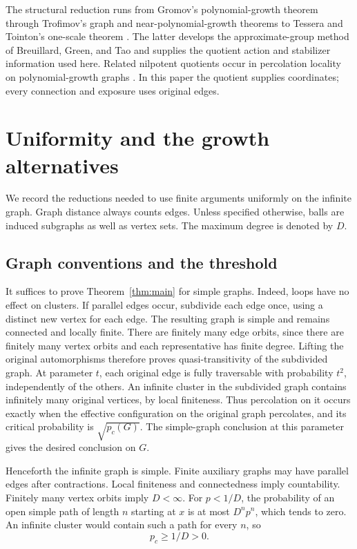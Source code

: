 \documentclass[11pt]{article}
\theoremstyle{definition}
\begin{document}
The structural reduction runs from Gromov's polynomial-growth
theorem \cite{Gromov1981} through Trofimov's graph and
near-polynomial-growth theorems \cite{Trofimov1985,Trofimov2003}
to Tessera and Tointon's one-scale theorem
\cite[Corollary~2.4]{TesseraTointon2021}. The latter develops the
approximate-group method of Breuillard, Green, and Tao
\cite{BreuillardGreenTao2012} and supplies the quotient action and
stabilizer information used here. Related nilpotent quotients occur
in percolation locality on polynomial-growth graphs
\cite{ContrerasMartineauTassion2023Locality}. In this paper the
quotient supplies coordinates; every connection and exposure uses
original edges.

\section{Uniformity and the growth alternatives}
\label{sec:preliminaries}

We record the reductions needed to use finite arguments uniformly on
the infinite graph. Graph distance always counts edges. Unless
specified otherwise, balls are induced subgraphs as well as vertex
sets. The maximum degree is denoted by $D$.

\subsection{Graph conventions and the threshold}

It suffices to prove Theorem~\ref{thm:main} for simple graphs.
Indeed, loops have no effect on clusters. If parallel edges occur,
subdivide each edge once, using a distinct new vertex for each edge.
The resulting graph is simple and remains connected and locally
finite. There are finitely many edge orbits, since there are finitely
many vertex orbits and each representative has finite degree.
Lifting the original automorphisms therefore proves quasi-transitivity
of the subdivided graph. At parameter $t$, each original edge is
fully traversable with probability $t^2$, independently of the others.
An infinite cluster in the subdivided graph contains infinitely many
original vertices, by local finiteness. Thus percolation on it occurs
exactly when the effective configuration on the original graph
percolates, and its critical probability is $\sqrt{p_c(G)}$.
The simple-graph conclusion at this parameter gives the desired
conclusion on $G$.

Henceforth the infinite graph is simple. Finite auxiliary graphs may
have parallel edges after contractions. Local finiteness and
connectedness imply countability. Finitely many vertex orbits imply $D<\infty$.
For $p<1/D$, the probability of an open simple path of length $n$
starting at $x$ is at most $D^np^n$, which tends to zero. An infinite
cluster would contain such a path for every $n$, so
\begin{equation}
\label{eq:positive-threshold}
 p_c\ge 1/D>0.
\end{equation}
\end{document}
